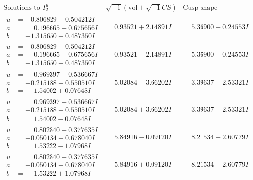 \documentclass[1p]{elsarticle_modified}
\theoremstyle{definition}
\newcommand{\I}{\sqrt{-1}}
\begin{document}
$$\begin{array}{c|c|c}  
\text{Solutions to }I^u_{2}& \I (\text{vol} + \sqrt{-1}CS) & \text{Cusp shape}\\
 \hline 
\begin{aligned}
u &= -0.806829 + 0.504212 I \\
a &= \phantom{-}0.196665 - 0.675656 I \\
b &= -1.315650 - 0.487350 I\end{aligned}
 & \phantom{-}0.93521 + 2.14891 I & \phantom{-}5.36900 + 0.24553 I \\ \hline\begin{aligned}
u &= -0.806829 - 0.504212 I \\
a &= \phantom{-}0.196665 + 0.675656 I \\
b &= -1.315650 + 0.487350 I\end{aligned}
 & \phantom{-}0.93521 - 2.14891 I & \phantom{-}5.36900 - 0.24553 I \\ \hline\begin{aligned}
u &= \phantom{-}0.969397 + 0.536667 I \\
a &= -0.215188 - 0.550510 I \\
b &= \phantom{-}1.54002 + 0.07648 I\end{aligned}
 & \phantom{-}5.02084 - 3.66202 I & \phantom{-}3.39637 + 2.53321 I \\ \hline\begin{aligned}
u &= \phantom{-}0.969397 - 0.536667 I \\
a &= -0.215188 + 0.550510 I \\
b &= \phantom{-}1.54002 - 0.07648 I\end{aligned}
 & \phantom{-}5.02084 + 3.66202 I & \phantom{-}3.39637 - 2.53321 I \\ \hline\begin{aligned}
u &= \phantom{-}0.802840 + 0.377635 I \\
a &= -0.050134 - 0.678040 I \\
b &= \phantom{-}1.53222 - 1.07968 I\end{aligned}
 & \phantom{-}5.84916 - 0.09120 I & \phantom{-}8.21534 + 2.60779 I \\ \hline\begin{aligned}
u &= \phantom{-}0.802840 - 0.377635 I \\
a &= -0.050134 + 0.678040 I \\
b &= \phantom{-}1.53222 + 1.07968 I\end{aligned}
 & \phantom{-}5.84916 + 0.09120 I & \phantom{-}8.21534 - 2.60779 I \\ \hline\begin{aligned}

\end{aligned}
\end{array}$$
\end{document}
